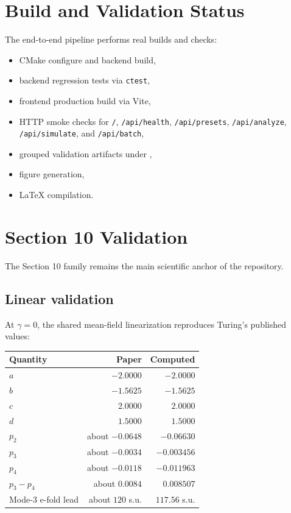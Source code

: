 \documentclass[11pt]{article}
\begin{document}
\section*{Build and Validation Status}
The end-to-end pipeline performs real builds and checks:
\begin{itemize}
    \item CMake configure and backend build,
    \item backend regression tests via \texttt{ctest},
    \item frontend production build via Vite,
    \item HTTP smoke checks for \texttt{/}, \texttt{/api/health}, \texttt{/api/presets}, \texttt{/api/analyze}, \texttt{/api/simulate}, and \texttt{/api/batch},
    \item grouped validation artifacts under ,
    \item figure generation,
    \item LaTeX compilation.
\end{itemize}

\section*{Section 10 Validation}
The Section 10 family remains the main scientific anchor of the repository.

\subsection*{Linear validation}
At \(\gamma = 0\), the shared mean-field linearization reproduces Turing's published values:

\begin{center}
\begin{tabular}{lrr}
\toprule
Quantity & Paper & Computed \\
\midrule
\(a\) & \(-2.0000\) & \(-2.0000\) \\
\(b\) & \(-1.5625\) & \(-1.5625\) \\
\(c\) & \(2.0000\) & \(2.0000\) \\
\(d\) & \(1.5000\) & \(1.5000\) \\
\(p_2\) & about \(-0.0648\) & \(-0.06630\) \\
\(p_3\) & about \(-0.0034\) & \(-0.003456\) \\
\(p_4\) & about \(-0.0118\) & \(-0.011963\) \\
\(p_3 - p_4\) & about \(0.0084\) & \(0.008507\) \\
Mode-3 e-fold lead & about \(120\) s.u. & \(117.56\) s.u. \\
\bottomrule
\end{tabular}
\end{center}
\end{document}
